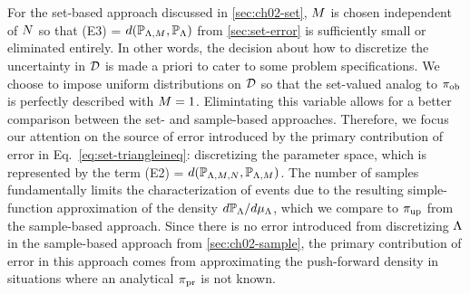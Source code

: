 For the set-based approach discussed in \ref{sec:ch02-set}, $M$ is chosen independent of $N$ so that (E3) = $d(\mathbb{P}_{{\Lambda}, M}, \mathbb{P}_{\Lambda})$ from \ref{sec:set-error} is sufficiently small or eliminated entirely.
In other words, the decision about how to discretize the uncertainty in $\mathcal{D}$ is made a priori to cater to some problem specifications.
We choose to impose uniform distributions on $\mathcal{D}$ so that the set-valued analog to $\operatorname*{\pi_{ob}}$ is perfectly described with $M=1$.
Elimintating this variable allows for a better comparison between the set- and sample-based approaches.
Therefore, we focus our attention on the source of error introduced by the primary contribution of error in Eq.~\eqref{eq:set-triangleineq}:  discretizing the parameter space, which is represented by the term (E2) = $d(\mathbb{P}_{{\Lambda}, M, N}, \mathbb{P}_{{\Lambda}, M})$.
The number of samples fundamentally limits the characterization of events due to the resulting simple-function approximation of the density $d\mathbb{P}_{\Lambda} / d\mu_{{\Lambda}}$, which we compare to $\operatorname*{\pi_{up}}$ from the sample-based approach.
Since there is no error introduced from discretizing ${\Lambda}$ in the sample-based approach from \ref{sec:ch02-sample}, the primary contribution of error in this approach comes from approximating the push-forward density in situations where an analytical $\operatorname*{\pi_{pr}}$ is not known.

\FloatBarrier


\FloatBarrier


\FloatBarrier
